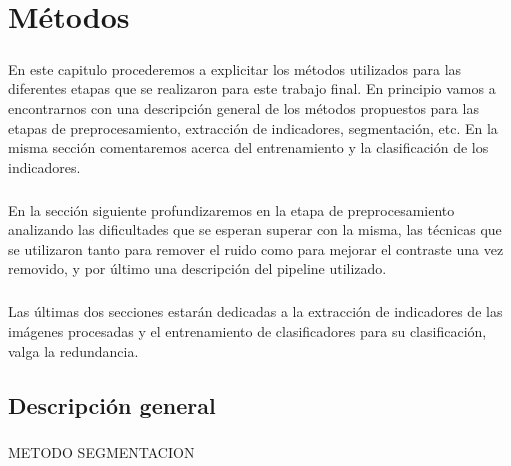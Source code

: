 
\chapter{M\'etodos} %

\label{Chapter3} %

\paragraph{}
En este capitulo procederemos a explicitar los métodos utilizados para las diferentes etapas que se realizaron para este trabajo final. En principio vamos a encontrarnos con una descripción general de los m\'etodos propuestos para las etapas de preprocesamiento, extracci\'on de indicadores, segmentaci\'on, etc. En la misma secci\'on comentaremos acerca del entrenamiento y la clasificaci\'on de los indicadores.
\paragraph{}
En la secci\'on siguiente profundizaremos en la etapa de preprocesamiento analizando las dificultades que se esperan superar con la misma, las t\'ecnicas que se utilizaron tanto para remover el ruido como para mejorar el contraste una vez removido, y por \'ultimo una descripci\'on del pipeline utilizado.
\paragraph{}
Las \'ultimas dos secciones estar\'an dedicadas a la extracci\'on de indicadores de las im\'agenes procesadas y el entrenamiento de clasificadores para su clasificaci\'on, valga la redundancia.


\section{Descripci\'on general}

\paragraph{}
METODO SEGMENTACION

